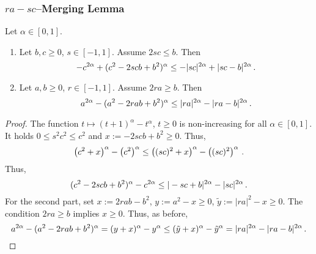 \subsubsection{$ra-sc$--Merging Lemma}
%
\begin{lemma}
	Let $\alpha\in[0,1]$.
	\theoremContentInNewLine
	\begin{enumerate}[label=\environmentEnumerateLabel]
	\item 
		Let $b,c\geq0$, $s\in[-1,1]$.
		Assume $2sc \leq b$.
		Then
		\begin{equation*}
			-c^{2\alpha}+(c^2 - 2 s c b+b^2)^\alpha \leq 
			-|sc|^{2\alpha}+|sc-b|^{2\alpha}
			\, .
		\end{equation*}
	\item
		Let $a,b\geq0$, $r\in[-1,1]$.
		Assume $2ra \geq b$.
		Then
		\begin{equation*}
			a^{2\alpha}-(a^2 - 2 r a b+b^2)^\alpha \leq 
			|ra|^{2\alpha}-|ra-b|^{2\alpha}
			\, .
		\end{equation*}
	\end{enumerate}
\end{lemma}
%
\begin{proof}
	The function $t \mapsto (t+1)^\alpha-t^\alpha$, $t\geq0$ is non-increasing for all $\alpha\in[0,1]$.
	It holds $0\leq s^2c^2\leq c^2$ and $x := -2 s c b+b^2 \geq 0$. Thus,
	\begin{equation*}
		\left( c^2+x \right)^\alpha-\left( c^2 \right)^\alpha \leq \left( (sc)^2+x \right)^\alpha-\left( (sc)^2 \right)^\alpha
		\, .
	\end{equation*}
	Thus, 
	\begin{equation*}
		(c^2-2 s c b+b^2)^\alpha -c^{2\alpha}\leq |-sc+b|^{2\alpha}-|sc|^{2\alpha}
		\, .
	\end{equation*}
	For the second part, set $x:=2rab-b^2$, $y := a^2-x\geq0$, $\tilde y := |ra|^2-x\geq 0$. The condition $2ra\geq b$ implies $x\geq 0$.
	Thus, as before,
	\begin{equation*}
		a^{2\alpha}-(a^2 - 2 r a b+b^2)^\alpha 
		=
		(y+x)^\alpha-y^\alpha 
		\leq 
		(\tilde y+x)^\alpha-\tilde y^\alpha 
		=
		|ra|^{2\alpha}-|ra-b|^{2\alpha}
		\, .
	\end{equation*}
\end{proof}
%
